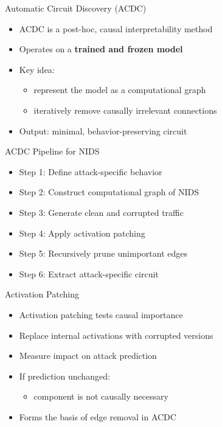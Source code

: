 \documentclass{beamer}
\begin{document}
	\begin{frame}{Automatic Circuit Discovery (ACDC)}
		\begin{itemize}
			\item ACDC is a post-hoc, causal interpretability method
			\item Operates on a \textbf{trained and frozen model}
			\item Key idea:
			\begin{itemize}
				\item represent the model as a computational graph
				\item iteratively remove causally irrelevant connections
			\end{itemize}
			\item Output: minimal, behavior-preserving circuit
		\end{itemize}
	\end{frame}
	
	\begin{frame}{ACDC Pipeline for NIDS}
		\begin{itemize}
			\item Step 1: Define attack-specific behavior
			\item Step 2: Construct computational graph of NIDS
			\item Step 3: Generate clean and corrupted traffic
			\item Step 4: Apply activation patching
			\item Step 5: Recursively prune unimportant edges
			\item Step 6: Extract attack-specific circuit
		\end{itemize}
	\end{frame}
	
	\begin{frame}{Activation Patching}
		\begin{itemize}
			\item Activation patching tests causal importance
			\item Replace internal activations with corrupted versions
			\item Measure impact on attack prediction
			\item If prediction unchanged:
			\begin{itemize}
				\item component is not causally necessary
			\end{itemize}
			\item Forms the basis of edge removal in ACDC
		\end{itemize}
	\end{frame}
	
\end{document}
